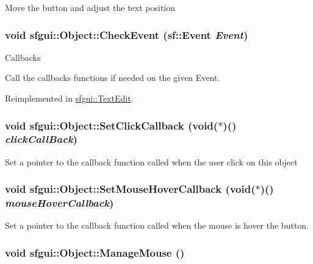 Move the button and adjust the text position \hypertarget{classsfgui_1_1Object_cd9dbf2abe79e04c22f281bccb8bdb0e}{
\subsubsection[CheckEvent]{\setlength{\rightskip}{0pt plus 5cm}void sfgui::Object::CheckEvent (sf::Event {\em Event})}}
\label{classsfgui_1_1Object_cd9dbf2abe79e04c22f281bccb8bdb0e}


Callbacks 

Call the callbacks functions if needed on the given Event. 

Reimplemented in \hyperlink{classsfgui_1_1TextEdit_af6d4be3633d3eb8bcc7a1007e324da8}{sfgui::TextEdit}.\hypertarget{classsfgui_1_1Object_d3d20a4cccde599748db724236ca0826}{
\subsubsection[SetClickCallback]{\setlength{\rightskip}{0pt plus 5cm}void sfgui::Object::SetClickCallback (void($\ast$)() {\em clickCallBack})}}
\label{classsfgui_1_1Object_d3d20a4cccde599748db724236ca0826}




Set a pointer to the callback function called when the user click on this object \hypertarget{classsfgui_1_1Object_8317dbdf44797dd69de490d4b946ed83}{
\subsubsection[SetMouseHoverCallback]{\setlength{\rightskip}{0pt plus 5cm}void sfgui::Object::SetMouseHoverCallback (void($\ast$)() {\em mouseHoverCallback})}}
\label{classsfgui_1_1Object_8317dbdf44797dd69de490d4b946ed83}




Set a pointer to the callback function called when the mouse is hover the button. \hypertarget{classsfgui_1_1Object_3332575d988f9eee589f57b2ad516593}{
\subsubsection[ManageMouse]{\setlength{\rightskip}{0pt plus 5cm}void sfgui::Object::ManageMouse ()}}
\label{classsfgui_1_1Object_3332575d988f9eee589f57b2ad516593}




